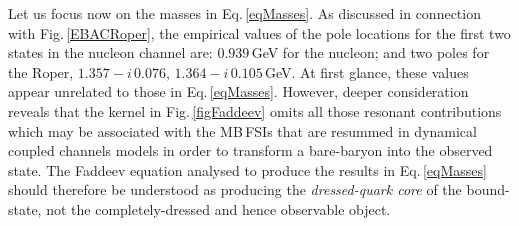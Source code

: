 Let us focus now on the masses in Eq.\,\eqref{eqMasses}.  As discussed in connection with Fig.\,\ref{EBACRoper}, the empirical values of the pole locations for the first two states in the nucleon channel are: $0.939\,$GeV for the nucleon; and two poles for the Roper, $1.357 - i \,0.076$, $1.364 - i \, 0.105\,$GeV.  At first glance, these values appear unrelated to those in Eq.\,\eqref{eqMasses}.  However, deeper consideration reveals \cite{Eichmann:2008ae, Eichmann:2008ef} that the kernel in Fig.\,\ref{figFaddeev} omits all those resonant contributions which may be associated with the MB\,FSIs that are resummed in dynamical coupled channels models  \cite{JuliaDiaz:2007kz, Suzuki:2009nj, Kamano:2010ud, Ronchen:2012eg, Kamano:2013iva, Doring:2014qaa} in order to transform a bare-baryon into the observed state.  The  Faddeev equation analysed to produce the results in Eq.\,\eqref{eqMasses} should therefore be understood as producing the \emph{dressed-quark core} of the bound-state, not the completely-dressed and hence observable object.

